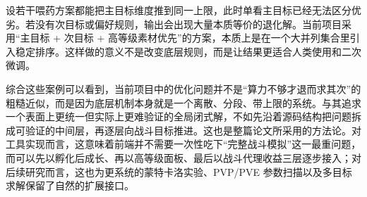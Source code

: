 设若干喂药方案都能把主目标维度推到同一上限，此时单看主目标已经无法区分优劣。若没有次目标或偏好规则，输出会出现大量本质等价的退化解。当前项目采用“主目标 + 次目标 + 高等级素材优先”的方案，本质上是在一个大并列集合里引入稳定排序。这样做的意义不是改变底层规则，而是让结果更适合人类使用和二次微调。

综合这些案例可以看到，当前项目中的优化问题并不是“算力不够才退而求其次”的粗糙近似，而是因为底层机制本身就是一个离散、分段、带上限的系统。与其追求一个表面上更统一但实际上更难验证的全局闭式解，不如先沿着源码结构把问题拆成可验证的中间层，再逐层向战斗目标推进。这也是整篇论文所采用的方法论。对工具实现而言，这意味着前端并不需要一次性吃下“完整战斗模拟”这一最重问题，而可以先以孵化后成长、再以高等级面板、最后以战斗代理收益三层逐步接入；对后续研究而言，这也为更系统的蒙特卡洛实验、PVP/PVE 参数扫描以及多目标求解保留了自然的扩展接口。

